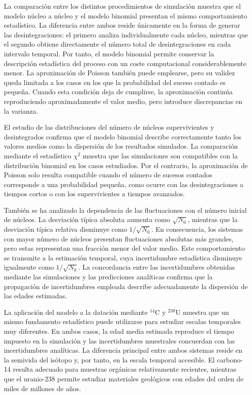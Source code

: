 \documentclass[12pt,a4paper]{article}
\begin{document}
La comparación entre los distintos procedimientos de simulación muestra que el modelo núcleo a núcleo y el modelo binomial presentan el mismo comportamiento estadístico. La diferencia entre ambos reside únicamente en la forma de generar las desintegraciones: el primero analiza individualmente cada núcleo, mientras que el segundo obtiene directamente el número total de desintegraciones en cada intervalo temporal. Por tanto, el modelo binomial permite conservar la descripción estadística del proceso con un coste computacional considerablemente menor. La aproximación de Poisson también puede emplearse, pero su validez queda limitada a los casos en los que la probabilidad del suceso contado es pequeña. Cuando esta condición deja de cumplirse, la aproximación continúa reproduciendo aproximadamente el valor medio, pero introduce discrepancias en la varianza.

El estudio de las distribuciones del número de núcleos supervivientes y desintegrados confirma que el modelo binomial describe correctamente tanto los valores medios como la dispersión de los resultados simulados. La comparación mediante el estadístico $\chi^2$ muestra que las simulaciones son compatibles con la distribución binomial en los casos estudiados. Por el contrario, la aproximación de Poisson solo resulta compatible cuando el número de sucesos contados corresponde a una probabilidad pequeña, como ocurre con las desintegraciones a tiempos cortos o con los supervivientes a tiempos avanzados.

También se ha analizado la dependencia de las fluctuaciones con el número inicial de núcleos. La desviación típica absoluta aumenta como $\sqrt{N_0}$, mientras que la desviación típica relativa disminuye como $1/\sqrt{N_0}$. En consecuencia, los sistemas con mayor número de núcleos presentan fluctuaciones absolutas más grandes, pero estas representan una fracción menor del valor medio. Este comportamiento se transmite a la estimación temporal, cuya incertidumbre estadística disminuye igualmente como $1/\sqrt{N_0}$. La concordancia entre las incertidumbres obtenidas mediante las simulaciones y las predicciones analíticas confirma que la propagación de incertidumbres empleada describe adecuadamente la dispersión de las edades estimadas.

La aplicación del modelo a la datación mediante $^{14}\text{C}$ y $^{238}\text{U}$ muestra que un mismo fundamento estadístico puede utilizarse para estudiar escalas temporales muy diferentes. En ambos casos, la edad media estimada reproduce el tiempo impuesto en la simulación y las incertidumbres muestrales concuerdan con las incertidumbres analíticas. La diferencia principal entre ambos sistemas reside en la semivida del isótopo y, por tanto, en la escala temporal accesible. El carbono-14 resulta adecuado para muestras orgánicas relativamente recientes, mientras que el uranio-238 permite estudiar materiales geológicos con edades del orden de miles de millones de años.
\end{document}
